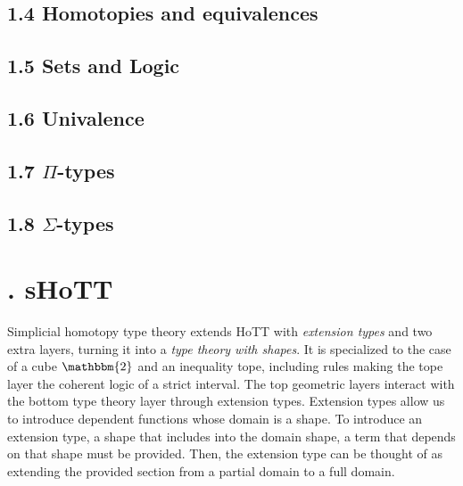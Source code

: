 \documentclass{article}
\theoremstyle{named}
\theoremstyle{remark}
\theoremstyle{definition}
\begin{document}
\subsection*{1.4 Homotopies and equivalences}



\subsection*{1.5 Sets and Logic}


\subsection*{1.6 Univalence}


\subsection*{1.7 $\Pi$-types}


\subsection*{1.8 $\Sigma$-types}


\newpage

\section*{. sHoTT}
\setcounter{section}{2}
\setcounter{equation}{0}
\setcounter{theorem}{0}
\setcounter{subsection}{1}

Simplicial homotopy type theory extends HoTT with \textit{extension types} and two extra layers, turning it into a
 \textit{type theory with shapes}. It is specialized to the case of a cube $\mathbbm{2}$ and an inequality tope, including rules making the tope layer the coherent logic of a strict interval. The top geometric layers interact with the bottom type theory layer
 through extension types. Extension types allow us to introduce dependent functions whose domain is a shape. To introduce an extension type, a shape that includes into the domain shape, a term that depends on that shape must be provided. Then, the extension
 type can be thought of as extending the provided section from a partial domain to a full domain. 
\end{document}
